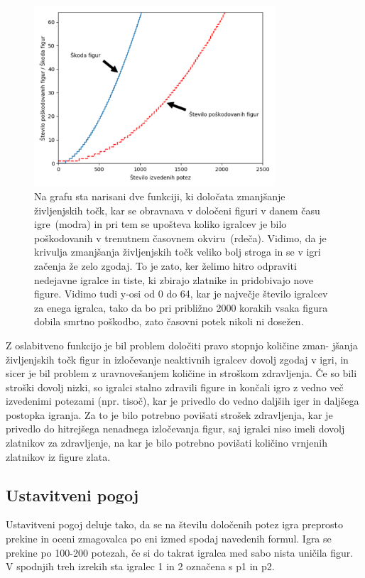 \documentclass[a4paper, 12pt]{book}
\begin{document}
{\begin{figure}[h!]
	\begin{center}
		\includegraphics[width=0.8\textwidth]{photos/destroy_formula_2018_11_17.pdf}
	\end{center}
	\caption{Na grafu sta narisani dve funkciji, ki določata zmanjšanje življenjskih točk, kar se obravnava v določeni figuri v danem času igre~(modra) in pri tem se upošteva koliko igralcev je bilo poškodovanih v trenutnem časovnem okviru~(rdeča).
	Vidimo, da je krivulja zmanjšanja življenjskih točk veliko bolj stroga in se v igri začenja že zelo zgodaj. 
	To je zato, ker želimo hitro odpraviti nedejavne igralce in tiste, ki zbirajo zlatnike in pridobivajo nove figure.
	Vidimo tudi y-osi od 0 do 64, kar je največje število igralcev za enega igralca, tako da bo pri približno 2000 korakih vsaka figura dobila smrtno poškodbo, zato časovni potek nikoli ni dosežen.}
	\label{destroy_formula_2018_11_17}
\end{figure}

Z oslabitveno funkcijo je bil problem določiti pravo stopnjo količine zman- jšanja življenjskih točk figur in izločevanje neaktivnih igralcev dovolj zgodaj v igri, in sicer je bil problem z uravnovešanjem količine in stroškom zdravljenja. 
Če so bili stroški dovolj nizki, so igralci stalno zdravili figure in končali igro z vedno več izvedenimi potezami (npr. tisoč), kar je privedlo do vedno daljših iger in daljšega postopka igranja.
Za to je bilo potrebno povišati strošek zdravljenja, kar je privedlo do hitrejšega nenadnega izločevanja figur, saj igralci niso imeli dovolj zlatnikov za zdravljenje, na kar je bilo potrebno povišati količino vrnjenih zlatnikov iz figure zlata.

\subsection{Ustavitveni pogoj}
Ustavitveni pogoj deluje tako, da se na številu določenih potez igra preprosto prekine in oceni zmagovalca po eni izmed spodaj navedenih formul.
Igra se prekine po 100-200 potezah, če si do takrat igralca med sabo nista uničila figur.
V spodnjih treh izrekih sta igralec 1 in 2 označena s p1 in p2.

}
\end{document}
